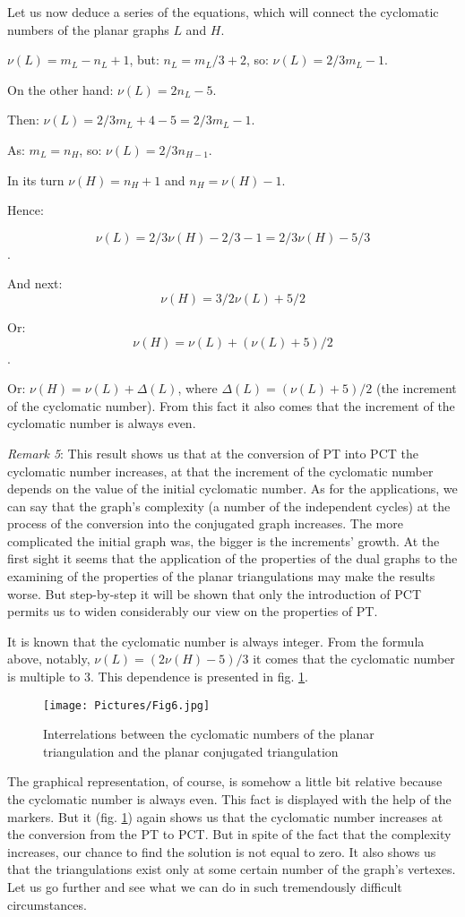 \documentclass{amsart}
\theoremstyle{plain}
\numberwithin{equation}{section}
\begin{document}
Let us now deduce a series of the equations, which will connect the cyclomatic numbers of the planar graphs $L$ and $H$.

$\nu(L)=m_L-n_L+1$, but: $n_L=m_L/3+2$, so: $\nu(L)=2/3 m_L-1$.

On the other hand: $\nu(L)=2n_L-5$.

Then: $\nu(L)=2/3 m_L+4-5=2/3 m_L-1$.

As: $m_L=n_H$, so: $\nu(L)=2/3 n_{H-1}$.

In its turn $\nu(H)=n_H+1$ and $n_H=\nu(H)-1$.

Hence: 

$$\nu(L)=2/3 \nu(H)-2/3-1= 2/3 \nu(H)-5/3$$.

And next: 
$$\nu(H)=3/2 \nu(L)+5/2$$

Or: 
$$\nu(H)=\nu(L)+(\nu(L)+5)/2$$.

Or: $\nu(H)=\nu(L)+\Delta(L)$, where $\Delta(L)=(\nu(L)+5)/2$ (the increment of the cyclomatic number). From this fact it also comes that the increment of the cyclomatic number is always even. 

\textit{Remark 5}: This result shows us that at the conversion of PT into PCT the cyclomatic number increases, at that the increment of the cyclomatic number depends on the value of the initial cyclomatic number. As for the applications, we can say that the graph's complexity (a number of the independent cycles) at the process of the conversion into the conjugated graph increases. The more complicated the initial graph was, the bigger is the increments' growth. At the first sight it seems that the application of the properties of the dual graphs \cite {Malinina} to the examining of the properties of the planar triangulations may make the results worse. But step-by-step it will be shown that only the introduction of PCT permits us to widen considerably our view on the properties of PT.

It is known that the cyclomatic number is always integer. From the formula above, notably, $\nu(L)=(2\nu(H)-5)/3$ it comes that the cyclomatic number is multiple to 3. This dependence is presented in fig. \ref{Fig:6}.

\begin{figure}[htb]
	\texttt{[image: Pictures/Fig6.jpg]}
	\caption{Interrelations between the cyclomatic numbers of the planar triangulation and the planar conjugated triangulation}
	\label{Fig:6}
\end{figure}

The graphical representation, of course, is somehow a little bit relative because the cyclomatic number is always even. This fact is displayed with the help of the markers. But it (fig. \ref{Fig:6}) again shows us that the cyclomatic number increases at the conversion from the PT to PCT. But in spite of the fact that the complexity increases, our chance to find the solution is not equal to zero. It also shows us that the triangulations exist only at some certain number of the graph's vertexes. Let us go further and see what we can do in such tremendously difficult circumstances.
\end{document}
